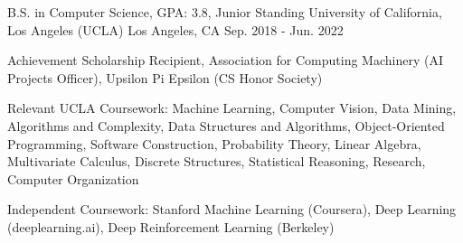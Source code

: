 

\begin{cventries}

  \cventry
    {B.S. in Computer Science, GPA: 3.8, Junior Standing} %
    {University of California, Los Angeles (UCLA)} %
    {Los Angeles, CA} %
    {Sep. 2018 - Jun. 2022} %
    {
      \begin{cvitems} %
        \item {Achievement Scholarship Recipient, Association for Computing Machinery
        (AI Projects Officer), Upsilon Pi Epsilon (CS Honor Society)}
        \item {Relevant UCLA Coursework: Machine Learning, Computer Vision, Data Mining,
        Algorithms and Complexity, Data Structures and Algorithms, Object-Oriented 
        Programming, Software Construction, Probability Theory, Linear Algebra, 
        Multivariate Calculus, Discrete Structures, Statistical Reasoning, 
        Research, Computer Organization}
        \item {Independent Coursework: Stanford Machine Learning (Coursera), Deep Learning (deeplearning.ai), Deep Reinforcement Learning (Berkeley)}
      \end{cvitems}
    }

\end{cventries}
